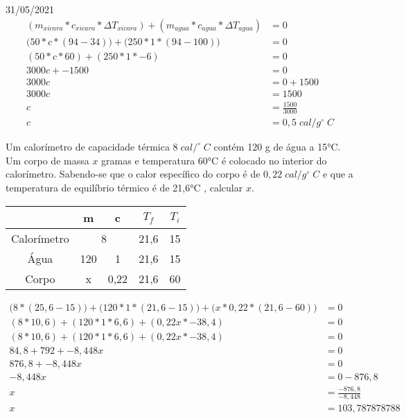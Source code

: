 \documentclass{SchoolBook}
\begin{document}
    \begin{day}{31/05/2021}
        \begin{align*}
            (m_{xicara} * c_{xicara} * \Delta T_{xicara}) + (m_{agua} * c_{agua} * \Delta T_{agua}) &= 0 \\
            \Big(50 * c * (94 - 34)\Big) + \Big(250 * 1 * (94 - 100)\Big) &= 0 \\
            (50 * c * 60) + (250 * 1 * -6) &= 0 \\
            3000c + −1500 &= 0 \\
            3000c &= 0 + 1500 \\
            3000c &= 1500 \\
            c &= \frac{1500}{3000} \\
            c &= 0,5\;cal/g^\circ\;C
        \end{align*}
        
        Um calorímetro de capacidade térmica $8\;cal/^\circ\;C$ contém 120 g de água a 15°C. Um corpo de massa $x$ gramas e temperatura 60°C é colocado no interior do calorímetro. Sabendo-se que o calor específico do corpo é de $0,22\;cal/g^\circ\;C$ e que a temperatura de equilíbrio térmico é de 21,6°C , calcular $x$.
        
        \begin{center}
            \vspace{6pt}
            \begin{tabular}{|c|c|c|c|c|}\hline
                            & m   & c    & $T_f$ & $T_i$ \\\hline
                Calorímetro & \multicolumn{2}{|c|}{8} & 21,6  & 15    \\\hline
                Água        & 120 & 1    & 21,6  & 15    \\\hline
                Corpo       & x   & 0,22 & 21,6  & 60    \\\hline
            \end{tabular}
        \end{center}
        
        \begin{align*}
            \Big(8 * (25,6 - 15)\Big) +
            \Big(120 * 1 * (21,6 - 15)\Big) +
            \Big(x * 0,22 * (21,6 - 60)\Big) &= 0 \\
            (8 * 10,6) +
            (120 * 1 * 6,6) +
            (0,22x * -38,4) &= 0 \\
            (8 * 10,6) +
            (120 * 1 * 6,6) +
            (0,22x * -38,4) &= 0 \\
            84,8 + 792 + -8,448x &= 0 \\
            876,8 + -8,448x &= 0 \\
            -8,448x &= 0 - 876,8 \\
            x &= \frac{-876,8}{-8,448} \\
            x &= 103,787878788
        \end{align*}
    \end{day}
\end{document}
